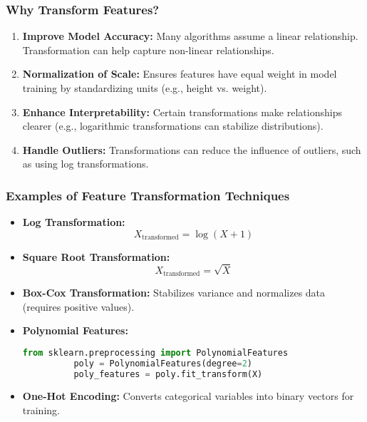\documentclass[aspectratio=169]{beamer}
\begin{document}
\begin{frame}[fragile]
  \frametitle{Why Transform Features?}
  \begin{enumerate}
    \item \textbf{Improve Model Accuracy:} 
          Many algorithms assume a linear relationship. Transformation can help capture non-linear relationships.
          
    \item \textbf{Normalization of Scale:} 
          Ensures features have equal weight in model training by standardizing units (e.g., height vs. weight).
          
    \item \textbf{Enhance Interpretability:} 
          Certain transformations make relationships clearer (e.g., logarithmic transformations can stabilize distributions).
          
    \item \textbf{Handle Outliers:} 
          Transformations can reduce the influence of outliers, such as using log transformations.
  \end{enumerate}
\end{frame}

\begin{frame}[fragile]
  \frametitle{Examples of Feature Transformation Techniques}
  \begin{itemize}
    \item \textbf{Log Transformation:}
          \begin{equation}
          X_{\text{transformed}} = \log(X + 1)
          \end{equation}
    
    \item \textbf{Square Root Transformation:}
          \begin{equation}
          X_{\text{transformed}} = \sqrt{X}
          \end{equation}
          
    \item \textbf{Box-Cox Transformation:} 
          Stabilizes variance and normalizes data (requires positive values).
    
    \item \textbf{Polynomial Features:}
          \begin{lstlisting}[language=Python]
          from sklearn.preprocessing import PolynomialFeatures
          poly = PolynomialFeatures(degree=2)
          poly_features = poly.fit_transform(X)
          \end{lstlisting}
    
    \item \textbf{One-Hot Encoding:} 
          Converts categorical variables into binary vectors for training.
  \end{itemize}
\end{frame}
\end{document}

